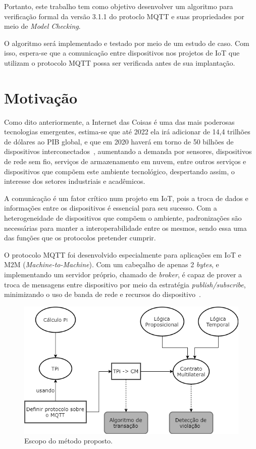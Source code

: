 Portanto, este trabalho tem como objetivo desenvolver um algoritmo para verificação formal da versão 3.1.1 do protoclo MQTT e suas propriedades por meio de \textit{Model Checking}.

O algoritmo será implementado e testado por meio de um estudo de caso. Com isso, espera-se que a comunicação entre dispositivos nos projetos de IoT que utilizam o protocolo MQTT possa ser verificada antes de sua implantação.

\section{Motivação}

Como dito anteriormente, a Internet das Coisas é uma das mais poderosas tecnologias emergentes, estima-se que até 2022 ela irá adicionar de 14,4 trilhões de dólares ao PIB global, e que em 2020 haverá em torno de 50 bilhões de dispositivos interconectados~\cite{morgan2014forbes}, aumentando a demanda por sensores, dispositivos de rede sem fio, serviços de armazenamento em nuvem, entre outros serviços e dispositivos que compõem este ambiente tecnológico, despertando assim, o interesse dos setores industriais e acadêmicos.

A comunicação é um fator crítico num projeto em IoT, pois a troca de dados e informações entre os dispositivos é essencial para seu sucesso. Com a heterogeneidade de dispositivos que compõem o ambiente, padronizações são necessárias para manter a interoperabilidade entre os mesmos, sendo essa uma das funções que os protocolos pretender cumprir.

O protocolo MQTT foi desenvolvido especialmente para aplicações em IoT e M2M (\textit{Machine-to-Machine}). Com um cabeçalho de apenas 2 \textit{bytes}, e implementando um servidor próprio, chamado de \textit{broker}, é capaz de prover a troca de mensagens entre dispositivo por meio da estratégia \textit{publish/subscribe}, minimizando o uso de banda de rede e recursos do dispositivo~\cite{mqttv3.1.1}. 

\begin{figure}[ht]
	\centering
	\includegraphics[width=1\textwidth]{imagens/tcc_estrutura.png}
	\caption{Escopo do método proposto.
		\label{fig:tcc_escopo}}
\end{figure}
\FloatBarrier

